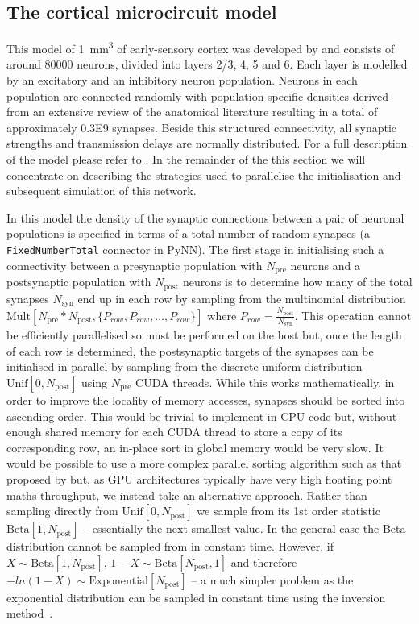 \documentclass[utf8]{frontiersSCNS} %
\begin{document}
\subsection{The cortical microcircuit model}
\label{sec:method/microcircuit}
This model of \SI{1}{\milli\metre\cubed} of early-sensory cortex was developed by \citet{Potjans2012} and consists of around \num{80000} neurons, divided into layers 2/3, 4, 5 and 6.
Each layer is modelled by an excitatory and an inhibitory neuron population.
Neurons in each population are connected randomly with population-specific densities derived from an extensive review of the anatomical literature resulting in a total of approximately \num{0.3E9} synapses.
Beside this structured connectivity, all synaptic strengths and transmission delays are normally distributed.
For a full description of the model please refer to \citeauthor{Potjans2012}.
In the remainder of the this section we will concentrate on describing the strategies used to parallelise the initialisation and subsequent simulation of this network.

In this model the density of the synaptic connections between a pair of neuronal populations is specified in terms of a total number of random synapses (a \lstinline{FixedNumberTotal} connector in PyNN).
The first stage in initialising such a connectivity between a presynaptic population with $N_{\text{pre}}$ neurons and a postsynaptic population with $N_{\text{post}}$ neurons is to determine how many of the total synapses $N_{\text{syn}}$ end up in each row by sampling from the multinomial distribution $\text{Mult}[N_{\text{pre}} * N_{\text{post}}, \{P_{row}, P_{row}, \ldots, P_{row}\}]$ where $P_{row} = \frac{N_{\text{post}}}{N_{\text{syn}}}$.
This operation cannot be efficiently parallelised so must be performed on the host but, once the length of each row is determined, the postsynaptic targets of the synapses can be initialised in parallel by sampling from the discrete uniform distribution $\text{Unif}[0, N_{\text{post}}]$ using $N_{\text{pre}}$ CUDA threads.
While this works mathematically, in order to improve the locality of memory accesses, synapses should be sorted into ascending order.
This would be trivial to implement in CPU code but, without enough shared memory for each CUDA thread to store a copy of its corresponding row, an in-place sort in global memory would be very slow.
It would be possible to use a more complex parallel sorting algorithm such as that proposed by \citet{Awan2016} but, as GPU architectures typically have very high floating point maths throughput, we instead take an alternative approach.
Rather than sampling directly from $\text{Unif}[0, N_{\text{post}}]$ we sample from its 1st order statistic $\text{Beta}[1, N_{\text{post}}]$ -- essentially the next smallest value.
In the general case the Beta distribution cannot be sampled from in constant time.
However, if $X \sim \text{Beta}[1, N_{\text{post}}]$, $1 - X \sim \text{Beta}[N_{\text{post}}, 1]$ and therefore $-ln(1 - X) \sim \text{Exponential}[N_{\text{post}}]$ -- a much simpler problem as the exponential distribution can be sampled in constant time using the inversion method~\citep{DevroyeLuc2013}.
\end{document}
